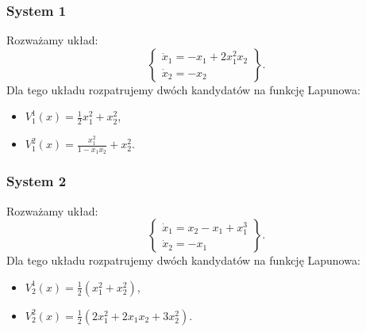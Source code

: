 \documentclass{sprawozdanie-agh}
\begin{document}
        \subsubsection{System 1}
        Rozważamy układ:
        \begin{equation}
            \label{eq:zadania_przyklad_1}
            \left\{
            \begin{array}{l}
                 \dot{x}_{1} = -x_{1} + 2x_{1}^{2}x_{2}\\
                 \dot{x}_{2} = -x_{2}
            \end{array}
            \right\}.
        \end{equation}
        Dla tego układu rozpatrujemy dwóch kandydatów na funkcję Lapunowa:
        \begin{itemize}[(a)]
            \item $V_{1}^{1}(x) = \frac{1}{2}x_{1}^{2} + x_{2}^{2}$,
            \item $V_{1}^{2}(x) = \frac{x_{1}^{2}}{1 - x_{1}x_{2}} + x_{2}^{2}$.
        \end{itemize}

        \subsubsection{System 2}
        Rozważamy układ:
        \begin{equation}
            \label{eq:zadania_przyklad_2}
            \left\{
            \begin{array}{l}
                 \dot{x}_{1} = x_{2} - x_{1} + x_{1}^{3}\\
                 \dot{x}_{2} = -x_{1}
            \end{array}
            \right\}.
        \end{equation}
        Dla tego układu rozpatrujemy dwóch kandydatów na funkcję Lapunowa:
        \begin{itemize}[(a)]
            \item $V_{2}^{1}(x) = \frac{1}{2} \left( x_{1}^{2} + x_{2}^{2} \right)$,
            \item $V_{2}^{2}(x) = \frac{1}{2} \left( 2x_{1}^{2} + 2x_{1}x_{2} + 3x_{2}^{2} \right)$.
        \end{itemize}

\end{document}

